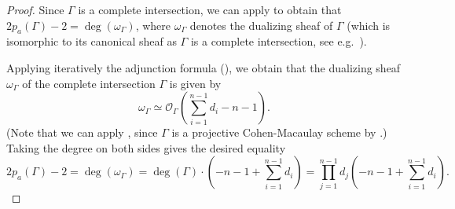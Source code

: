 \documentclass[english,11pt,reqno]{amsart}
\begin{document}
	\begin{proof}
		Since $\Gamma$ is a complete intersection, we can apply \cite[Cor.\ 7.3.31]{Qing_Liu-Algebraic_Geometry} to obtain that $2p_a(\Gamma)-2=\deg(\omega_{\Gamma})$, where $\omega_{\Gamma}$ denotes the dualizing sheaf of $\Gamma$ (which is isomorphic to its canonical sheaf as $\Gamma$ is a complete intersection, see e.g.\ \cite[Exercise 6.4.11, Chapter 6]{Qing_Liu-Algebraic_Geometry}). \par 
		Applying iteratively the adjunction formula (\cite[Prop.\ 29.4.8]{Rising_Sea-Vakil}), we obtain that the dualizing sheaf $\omega_{\Gamma}$ of the complete intersection $\Gamma$ is given by $$\omega_{\Gamma} \simeq \mathcal{O}_{\Gamma}\left(\sum_{i=1}^{n-1} d_i - n-1\right).$$
		(Note that we can apply \cite[Prop.\ 29.4.8]{Rising_Sea-Vakil}, since $\Gamma$ is a projective Cohen-Macaulay scheme by \cite[Prop.\ II.8.23]{Hartshorne}.)
		Taking the degree on both sides gives the desired equality $$2p_a(\Gamma)-2= \deg(\omega_{\Gamma})=\deg(\Gamma)\cdot \left(-n-1+\sum_{i=1}^{n-1} d_i\right)=\prod_{j=1}^{n-1} d_j \left(-n-1+\sum_{i=1}^{n-1} d_i \right).$$
	
	
\end{proof}
%
%
%
\end{document}
